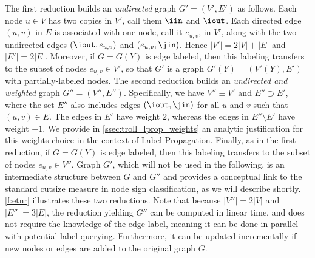 The first reduction builds an \emph{undirected} graph $G' = (V',E')$ as
follows. Each node $u \in V$ has two copies in $V'$, call them $\iin$ and $\iout$. Each directed
edge $(u,v)$ in $E$ is associated with one node, call it $e_{u,v}$, in $V'$, along with the two
undirected edges $(\iout,e_{u,v})$ and $(e_{u,v},\jin)$. Hence $|V'| = 2|V|+|E|$ and $|E'| = 2|E|$.
Moreover, if $G = G(Y)$ is edge labeled, then this labeling transfers to the subset of nodes
$e_{u,v} \in V'$, so that $G'$ is a graph $G'(Y) = (V'(Y),E')$ with partially-labeled nodes. The
second reduction builds an \emph{undirected and weighted} graph $G'' =
(V'',E'')$. Specifically, we have $V'' \equiv V'$ and $E'' \supset E'$, where the set $E''$ also
includes edges $(\iout,\jin)$ for all $u$ and $v$ such that $(u,v) \in E$. The edges in $E'$ have
weight $2$, whereas the edges in $E''\setminus E'$ have weight $-1$. We provide in
\autoref{ssec:troll_lprop_weights} an analytic justification for this weights choice in the context
of Label Propagation. Finally, as in the first reduction, if $G = G(Y)$ is edge
labeled, then this labeling transfers to the subset of nodes $e_{u,v} \in V''$. Graph $G'$, which
will not be used in the following, is an intermediate structure between $G$ and $G''$ and provides a
conceptual link to the standard cutsize measure in node sign classification, as we will describe
shortly. \autoref{f:etnr} illustrates these two reductions. Note that because $|V''|=2|V|$ and
$|E''|=3|E|$, the reduction yielding $G''$ can be computed in linear time, and does not require the
knowledge of the edge label, meaning it can be done in parallel with potential label querying.
Furthermore, it can be updated incrementally if new nodes or edges are added to the original graph
$G$.


